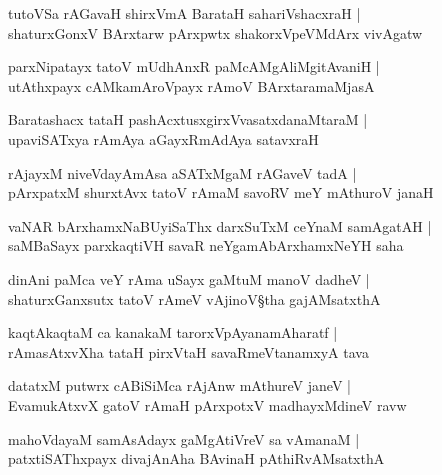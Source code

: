 \begin{shloka}
tutoVSa rAGavaH shirxVmA\R{} BarataH sahariVshacxraH |\\
shaturxGonxV BArxtarw pArxpwtx shakorxVpeVMdArx vivAgatw
\end{shloka}

\begin{shloka}
parxNipatayx tatoV mUdhAnxR paMcAMgAliMgitAvaniH |\\
utAthxpayx cAMkamAroVpayx rAmoV BArxtaramaMjasA 
\end{shloka}

\begin{shloka}
Baratashacx tataH pashAcxtusxgirxVvasatxdanaMtaraM |\\
upaviSATxya rAmAya aGayxRmAdAya satavxraH 
\end{shloka}

\begin{shloka}
rAjayxM niveVdayAmAsa aSATxMgaM rAGaveV tadA |\\
pArxpatxM shurxtAvx tatoV rAmaM savoRV meY mAthuroV janaH 
\end{shloka}

\begin{shloka}
vaNAR bArxhamxNaBUyiSaThx darxSuTxM ceYnaM samAgatAH |\\
saMBaSayx parxkaqtiVH savaR\R{} neYgamA\R bArxhamxNeYH saha
\end{shloka}

\begin{shloka}
dinAni paMca veY rAma uSayx gaMtuM manoV dadheV |\\
shaturxGanxsutx tatoV rAmeV vAjinoV\S tha gajAMsatxthA 
\end{shloka}

\begin{shloka}
kaqtAkaqtaM ca kanakaM tarorxVpAyanamAharatf |\\
rAmasAtxvXha tataH pirxVtaH savaRmeVtanamxyA tava
\end{shloka}

\begin{shloka}
datatxM putwrx cABiSiMca rAjAnw mAthureV janeV |\\
EvamukAtxvX gatoV rAmaH pArxpotxV madhayxMdineV ravw
\end{shloka}

\begin{shloka}
mahoVdayaM samAsAdayx gaMgAtiVreV sa vAmanaM |\\
patxtiSAThxpayx divajAnAha BAvinaH pAthiRvAMsatxthA
\end{shloka}

